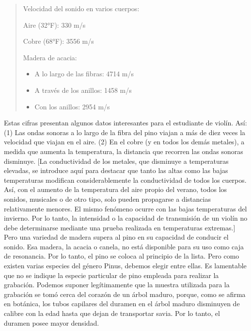\begin{quote}
Velocidad del sonido en varios cuerpos:

Aire (32°F): 330 m/s

Cobre (68°F): 3556 m/s

Madera de acacia:
\begin{itemize}
\item A lo largo de las fibras: 4714 m/s
\item A través de los anillos: 1458 m/s
\item Con los anillos: 2954 m/s
\end{itemize}
\end{quote}

Estas cifras presentan algunos datos interesantes para el estudiante de violín. Así: (1) Las ondas sonoras a lo largo de la fibra del pino viajan a más de diez veces la velocidad que viajan en el aire. (2) En el cobre (y en todos los demás metales), a medida que aumenta la temperatura, la distancia que recorren las ondas sonoras disminuye.
[La conductividad de los metales, que disminuye a temperaturas elevadas, se introduce aquí para destacar que tanto las altas como las bajas temperaturas modifican considerablemente la conductividad de todos los cuerpos. Así, con el aumento de la temperatura del aire propio del verano, todos los sonidos, musicales o de otro tipo, solo pueden propagarse a distancias relativamente menores. El mismo fenómeno ocurre con las bajas temperaturas del invierno. Por lo tanto, la intensidad o la capacidad de transmisión de un violín no debe determinarse mediante una prueba realizada en temperaturas extremas.]
Pero una variedad de madera supera al pino en su capacidad de conducir el sonido. Esa madera, la acacia o canela, no está disponible para su uso como caja de resonancia. Por lo tanto, el pino se coloca al principio de la lista. Pero como existen varias especies del género Pinus, debemos elegir entre ellas. Es lamentable que no se indique la especie particular de pino empleada para realizar la grabación. Podemos suponer legítimamente que la muestra utilizada para la grabación se tomó cerca del corazón de un árbol maduro, porque, como se afirma en botánica, los tubos capilares del duramen en el árbol maduro disminuyen de calibre con la edad hasta que dejan de transportar savia. Por lo tanto, el duramen posee mayor densidad.
